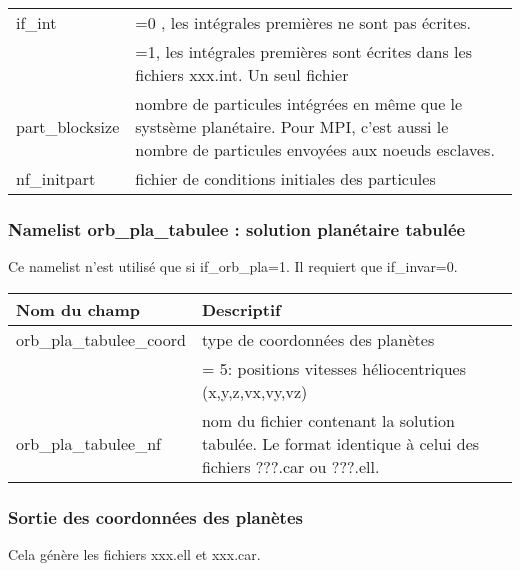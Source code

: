 \documentclass[11pt]{article}
\begin{document}
\begin{tabularx}{\textwidth}{|l|X|}
 if\_int & =0 , les int\'egrales premi\`eres ne sont pas \'ecrites.\\
&=1, les int\'egrales premi\`eres sont \'ecrites dans les fichiers xxx.int. Un seul fichier\\ \hline
 

part\_blocksize & nombre de particules int\'egr\'ees en m\^eme que le systs\`eme plan\'etaire. Pour MPI, c'est aussi le nombre de particules envoy\'ees aux noeuds esclaves.\\ \hline
nf\_initpart & fichier de conditions initiales des particules\\ \hline
\end{tabularx}


\subsubsection*{Namelist orb\_pla\_tabulee : solution planétaire tabulée}
Ce namelist n'est utilisé que si if\_orb\_pla=1. Il requiert que if\_invar=0.

\begin{tabularx}{\textwidth}{|l|X|}
\hline
Nom du champ& Descriptif \\ \hline 
orb\_pla\_tabulee\_coord & type de coordonn\'ees des plan\`etes \\
&= 5:  positions vitesses h\'eliocentriques (x,y,z,vx,vy,vz)

 \\\hline
orb\_pla\_tabulee\_nf & nom du fichier contenant la solution tabulée. 
Le format identique à celui des fichiers ???.car ou ???.ell.\\ \hline
\end{tabularx}


\vspace{0.5cm}
\subsubsection*{Sortie des coordonn\'ees des plan\`etes}
Cela g\'en\`ere les fichiers xxx.ell et xxx.car.
\end{document}
